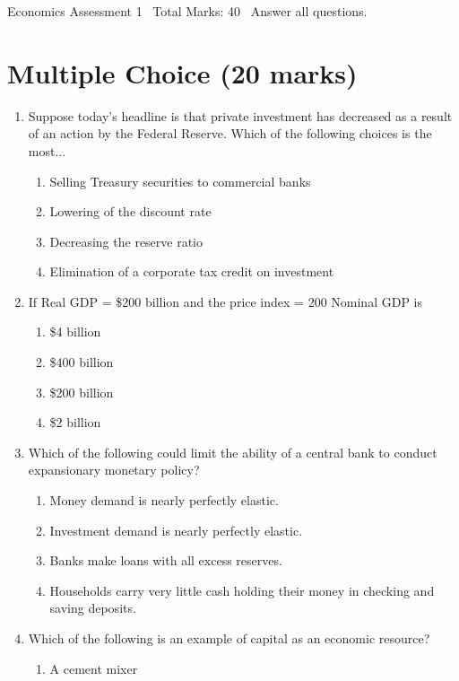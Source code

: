\documentclass[12pt]{article}
\begin{document}
\begin{center}
Economics Assessment 1 \
Total Marks: 40 \
Answer all questions.
\end{center}

\section*{Multiple Choice (20 marks)}
\begin{enumerate}[label=\arabic*.]
\item Suppose today's headline is that private investment has decreased as a result of an action by the Federal Reserve. Which of the following choices is the most...
\begin{enumerate}[label=(\alph*)]
    \item Selling Treasury securities to commercial banks
    \item Lowering of the discount rate
    \item Decreasing the reserve ratio
    \item Elimination of a corporate tax credit on investment
\end{enumerate}
\item If Real GDP = \$200 billion and the price index = 200 Nominal GDP is
\begin{enumerate}[label=(\alph*)]
    \item \$4 billion
    \item \$400 billion
    \item \$200 billion
    \item \$2 billion
\end{enumerate}
\item Which of the following could limit the ability of a central bank to conduct expansionary monetary policy?
\begin{enumerate}[label=(\alph*)]
    \item Money demand is nearly perfectly elastic.
    \item Investment demand is nearly perfectly elastic.
    \item Banks make loans with all excess reserves.
    \item Households carry very little cash holding their money in checking and saving deposits.
\end{enumerate}
\item Which of the following is an example of capital as an economic resource?
\begin{enumerate}[label=(\alph*)]
    \item A cement mixer

\end{enumerate}
\end{enumerate}
\end{document}
